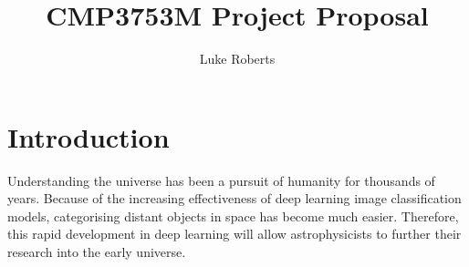 \documentclass[12pt,runningheads]{llncs}
\begin{document}
\title{
    CMP3753M Project Proposal
}

\author{Luke Roberts}


\maketitle

\section{Introduction}
%
%
%
%
%
Understanding the universe has been a pursuit of humanity for thousands of
years. Because of the increasing effectiveness of deep learning image
classification models, categorising distant objects in space has become much
easier. Therefore, this rapid development in deep learning will allow
astrophysicists to further their research into the early universe.
\end{document}
